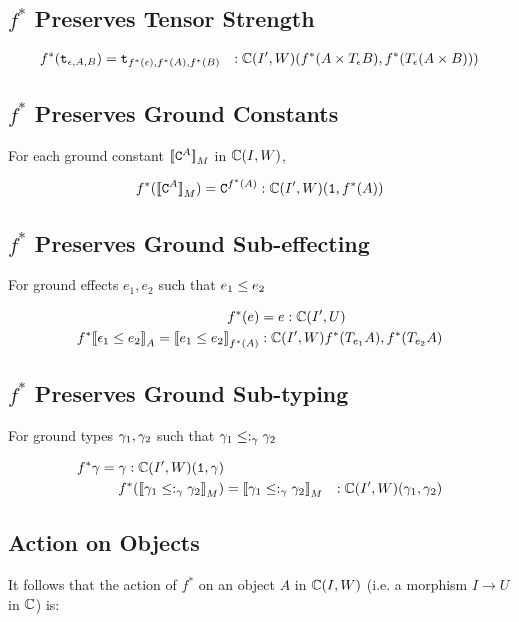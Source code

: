 \documentclass{report}
\newcommand\ciw[0]{\C(I, W)}
\newcommand\cipw[0]{\C(I', W)}
\newcommand\cipu[0]{\C(I', U)}
\renewcommand\star[0]{^*}
\newcommand\subtypeg[0]{\subtype_\g}
\begin{document}
\subsection{$f\star$ Preserves Tensor Strength}
\begin{align}
    f\star(\tstrength{\e}{A}{B}) &= \tstrength{f\star(\e)}{f\star(A)}{f\star(B)} &: \cipw(f\star(A\times\teb), f\star(\T{\e}{(A\times B)}))
\end{align}
\subsection{$f\star$ Preserves Ground Constants}
For each ground constant ${\bf [\![}\texttt{C}^{A}{\bf ]\!]}_M$ in $\ciw$,

\begin{align}
    f\star(\deno{\const{A}}) = \const{f\star(A)} : \cipw(\1, f\star(A))
\end{align}
\subsection{$f\star$ Preserves Ground Sub-effecting}
For ground effects $e_1, e_2$ such that $e_1\leq e_2$



\begin{align}
    f\star(e) & = e: \cipu\\
    f\star\db{\e_1\subeffect e_2}_A = \db{e_1 \subeffect e_2}_{f\star(A)} &:\cipw{f\star(\T{e_1}{A}), f\star(\T{e_2}{A})} \\
\end{align}
\subsection{$f\star$ Preserves Ground Sub-typing}
For ground types $\gamma_1, \gamma_2$ such that $\g_1\subtypeg\g_2$

\begin{align}
    f\star{\g} = \g: \cipw(\1, \g)\\
    f\star(\deno{\g_1 \subtypeg \g_2}) & = \deno{\g_1 \subtypeg \g_2} &: \cipw(\g_1, \g_2)\\
\end{align}

\subsection{Action on Objects}

It follows that the action of $f\star$ on an object $A$ in $\ciw$ (i.e. a morphism $I \rightarrow U$ in $\mathbb{C}$) is:
\end{document}
